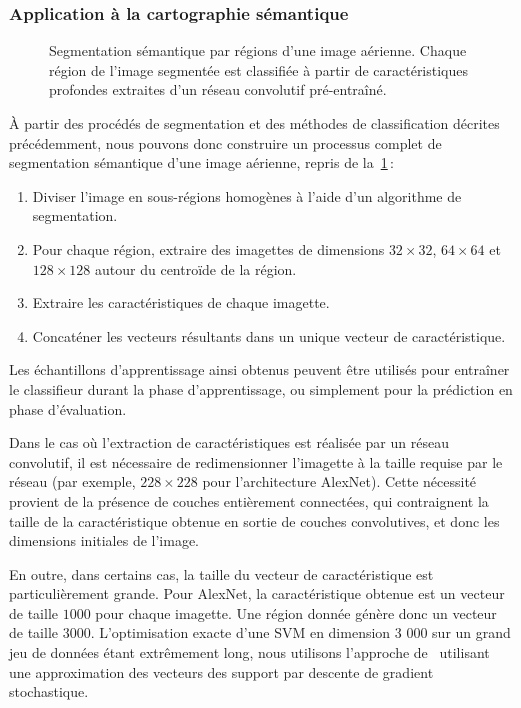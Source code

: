\subsubsection{Application à la cartographie sémantique}

\begin{figure}
\resizebox{\textwidth}{!}{%

}
\caption{Segmentation sémantique par régions d'une image aérienne. Chaque région de l'image segmentée est classifiée à partir de caractéristiques profondes extraites d'un réseau convolutif pré-entraîné.}
\label{fig:framework}
\end{figure}

À partir des procédés de segmentation et des méthodes de classification décrites précédemment, nous pouvons donc construire un processus complet de segmentation sémantique d'une image aérienne, repris de la~\cref{fig:framework}\,:
\begin{enumerate}
    \item Diviser l'image en sous-régions homogènes à l'aide d'un algorithme de segmentation.
    \item Pour chaque région, extraire des imagettes de dimensions $32\times32$, $64\times64$ et $128\times128$ autour du centroïde de la région.
    \item Extraire les caractéristiques de chaque imagette.
    \item Concaténer les vecteurs résultants dans un unique vecteur de caractéristique.
\end{enumerate}

Les échantillons d'apprentissage ainsi obtenus peuvent être utilisés pour entraîner le classifieur durant la phase d'apprentissage, ou simplement pour la prédiction en phase d'évaluation.

Dans le cas où l'extraction de caractéristiques est réalisée par un réseau convolutif, il est nécessaire de redimensionner l'imagette à la taille requise par le réseau (par exemple, $228\times228$ pour l'architecture AlexNet). Cette nécessité provient de la présence de couches entièrement connectées, qui contraignent la taille de la caractéristique obtenue en sortie de couches convolutives, et donc les dimensions initiales de l'image.

En outre, dans certains cas, la taille du vecteur de caractéristique est particulièrement grande. Pour AlexNet, la caractéristique obtenue est un vecteur de taille $1 000$ pour chaque imagette. Une région donnée génère donc un vecteur de taille $3 000$. L'optimisation exacte d'une \gls{SVM} en dimension 3 000 sur un grand jeu de données étant extrêmement long, nous utilisons l'approche de~\citet{bottou_large-scale_2010} utilisant une approximation des vecteurs des support par descente de gradient stochastique.

